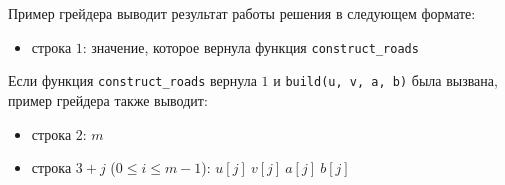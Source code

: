 Пример грейдера выводит результат работы решения в следующем формате:
\begin{itemize}
\item строка $1$: значение, которое вернула функция \texttt{construct\_roads}
\end{itemize}

Если функция \texttt{construct\_roads} вернула $1$
  и \texttt{build(u, v, a, b)} была вызвана,
  пример грейдера также выводит:
\begin{itemize}
\item строка $2$: $m$
\item строка $3+j$ ($0 \leq i \leq m - 1$): $u[j]\ v[j]\ a[j]\ b[j]$
\end{itemize}